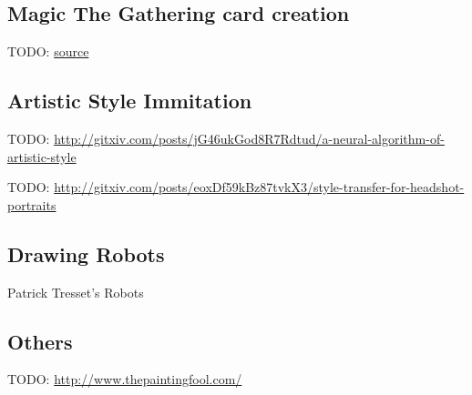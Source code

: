 \subsection{Magic The Gathering card creation}

TODO: \href{http://nerdist.com/what-happens-when-artificial-intelligence-makes-magic-the-gathering-cards/}{source}

\subsection{Artistic Style Immitation}
TODO: \href{http://gitxiv.com/posts/jG46ukGod8R7Rdtud/a-neural-algorithm-of-artistic-style}{http://gitxiv.com/posts/jG46ukGod8R7Rdtud/a-neural-algorithm-of-artistic-style}

TODO: \href{http://gitxiv.com/posts/eoxDf59kBz87tvkX3/style-transfer-for-headshot-portraits}{http://gitxiv.com/posts/eoxDf59kBz87tvkX3/style-transfer-for-headshot-portraits}

\subsection{Drawing Robots}
Patrick Tresset's Robots

\subsection{Others}

TODO: \href{http://www.thepaintingfool.com/}{http://www.thepaintingfool.com/}